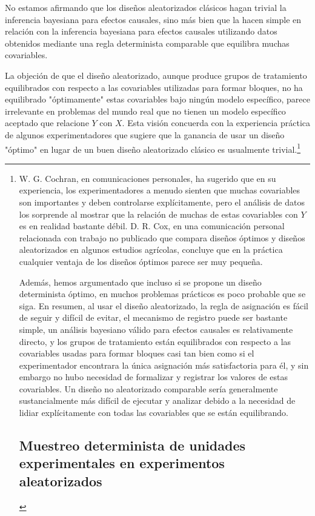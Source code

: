 \documentclass[12pt,a4paper]{article}
\begin{document}
{No estamos afirmando que los diseños aleatorizados clásicos hagan trivial la inferencia bayesiana para efectos causales, sino más bien que la hacen simple en relación con la inferencia bayesiana para efectos causales utilizando datos obtenidos mediante una regla determinista comparable que equilibra muchas covariables.

La objeción de que el diseño aleatorizado, aunque produce grupos de tratamiento equilibrados con respecto a las covariables utilizadas para formar bloques, no ha equilibrado "óptimamente" estas covariables bajo ningún modelo específico, parece irrelevante en problemas del mundo real que no tienen un modelo específico aceptado que relacione $Y$ con $X$. Esta visión concuerda con la experiencia práctica de algunos experimentadores que sugiere que la ganancia de usar un diseño "óptimo" en lugar de un buen diseño aleatorizado clásico es usualmente trivial.\footnote{W. G. Cochran, en comunicaciones personales, ha sugerido que en su experiencia, los experimentadores a menudo sienten que muchas covariables son importantes y deben controlarse explícitamente, pero el análisis de datos los sorprende al mostrar que la relación de muchas de estas covariables con $Y$ es en realidad bastante débil.  D. R. Cox, en una comunicación personal relacionada con trabajo no publicado que compara diseños óptimos y diseños aleatorizados en algunos estudios agrícolas, concluye que en la práctica cualquier ventaja de los diseños óptimos parece ser muy pequeña. 

Además, hemos argumentado que incluso si se propone un diseño determinista óptimo, en muchos problemas prácticos es poco probable que se siga. En resumen, al usar el diseño aleatorizado, la regla de asignación es fácil de seguir y difícil de evitar, el mecanismo de registro puede ser bastante simple, un análisis bayesiano válido para efectos causales es relativamente directo, y los grupos de tratamiento están equilibrados con respecto a las covariables usadas para formar bloques casi tan bien como si el experimentador encontrara la única asignación más satisfactoria para él, y sin embargo no hubo necesidad de formalizar y registrar los valores de estas covariables. Un diseño no aleatorizado comparable sería generalmente sustancialmente más difícil de ejecutar y analizar debido a la necesidad de lidiar explícitamente con todas las covariables que se están equilibrando. 

\subsection{Muestreo determinista de unidades experimentales en experimentos aleatorizados}

}}
\end{document}
